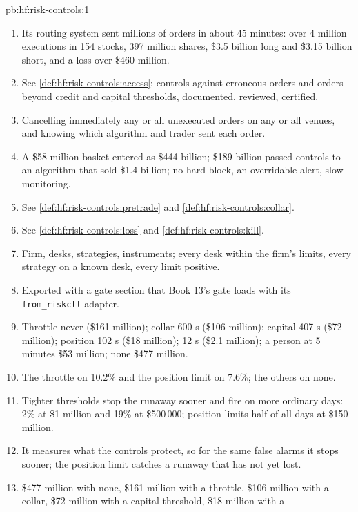 \begin{solution}{pb:hf:risk-controls:1}
\begin{enumerate}
\item Its routing system sent millions of orders in about 45 minutes: over 4 million executions in 154 stocks, 397 million shares, \$3.5 billion
long and \$3.15 billion short, and a loss over \$460 million.
\item See \cref{def:hf:risk-controls:access}; controls against erroneous orders and orders beyond credit and capital thresholds, documented, reviewed,
certified.
\item Cancelling immediately any or all unexecuted orders on any or all venues, and knowing which algorithm and trader sent each order.
\item A \$58 million basket entered as \$444 billion; \$189 billion passed controls to an algorithm that sold \$1.4 billion; no hard block, an
overridable alert, slow monitoring.
\item See \cref{def:hf:risk-controls:pretrade} and \cref{def:hf:risk-controls:collar}.
\item See \cref{def:hf:risk-controls:loss} and \cref{def:hf:risk-controls:kill}.
\item Firm, desks, strategies, instruments; every desk within the firm's limits, every strategy on a known desk, every limit positive.
\item Exported with a gate section that Book 13's gate loads with its \texttt{from\_riskctl} adapter.
\item Throttle never (\$161 million); collar 600 s (\$106 million); capital 407 s (\$72 million); position 102 s (\$18 million);  12 s (\$2.1
million); a person at 5 minutes \$53 million; none \$477 million.
\item The throttle on 10.2\% and the position limit on 7.6\%; the others on none.
\item Tighter thresholds stop the runaway sooner and fire on more ordinary days:  2\% at \$1 million and 19\% at \$500\,000; position
limits half of all days at \$150 million.
\item It measures what the controls protect, so for the same false alarms it stops sooner; the position limit catches a runaway that has not yet
lost.
\item \$477 million with none, \$161 million with a throttle, \$106 million with a collar, \$72 million with a capital threshold, \$18 million with a

\end{enumerate}
\end{solution}
